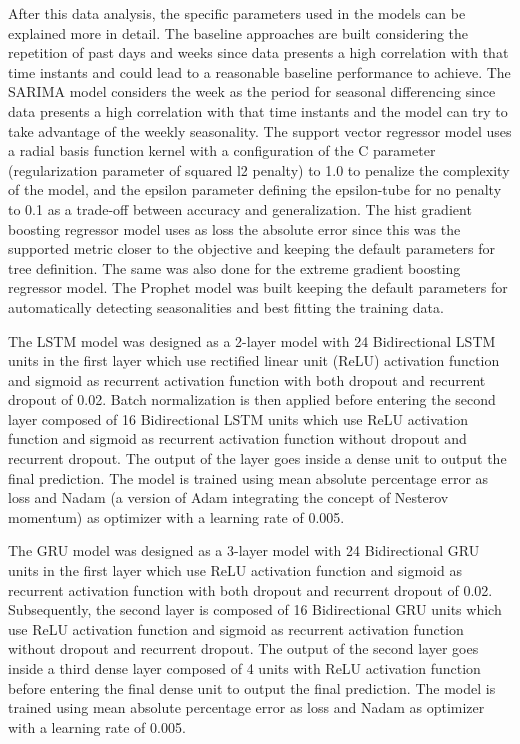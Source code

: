 After this data analysis, the specific parameters used in the models can be explained more in detail.
The baseline approaches are built considering the repetition of past days and weeks since data presents a high correlation with that time instants and could lead to a reasonable baseline performance to achieve.
The SARIMA model considers the week as the period for seasonal differencing since data presents a high correlation with that time instants and the model can try to take advantage of the weekly seasonality.
The support vector regressor model uses a radial basis function kernel with a configuration of the C parameter (regularization parameter of squared l2 penalty) to 1.0 to penalize the complexity of the model, and the epsilon parameter defining the epsilon-tube for no penalty to 0.1 as a trade-off between accuracy and generalization.
The hist gradient boosting regressor model uses as loss the absolute error since this was the supported metric closer to the objective and keeping the default parameters for tree definition.
The same was also done for the extreme gradient boosting regressor model.
The Prophet model was built keeping the default parameters for automatically detecting seasonalities and best fitting the training data.

The LSTM model was designed as a 2-layer model with 24 Bidirectional LSTM units in the first layer which use rectified linear unit (ReLU) activation function and sigmoid as recurrent activation function with both dropout and recurrent dropout of 0.02.
Batch normalization is then applied before entering the second layer composed of 16 Bidirectional LSTM units which use ReLU activation function and sigmoid as recurrent activation function without dropout and recurrent dropout.
The output of the layer goes inside a dense unit to output the final prediction.
The model is trained using mean absolute percentage error as loss and Nadam (a version of Adam integrating the concept of Nesterov momentum) as optimizer with a learning rate of 0.005.

The GRU model was designed as a 3-layer model with 24 Bidirectional GRU units in the first layer which use ReLU activation function and sigmoid as recurrent activation function with both dropout and recurrent dropout of 0.02.
Subsequently, the second layer is composed of 16 Bidirectional GRU units which use ReLU activation function and sigmoid as recurrent activation function without dropout and recurrent dropout.
The output of the second layer goes inside a third dense layer composed of 4 units with ReLU activation function before entering the final dense unit to output the final prediction.
The model is trained using mean absolute percentage error as loss and Nadam as optimizer with a learning rate of 0.005.

